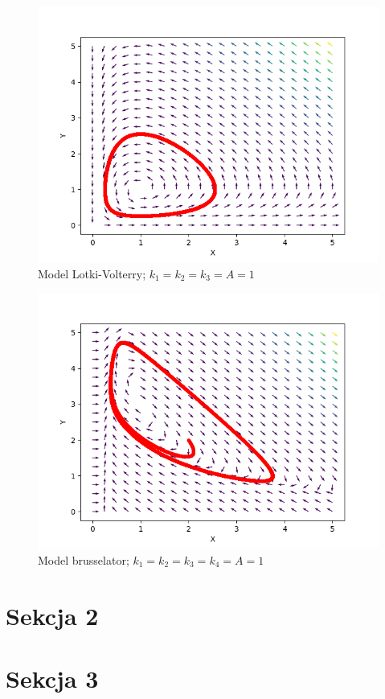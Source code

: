 \documentclass[10pt, a4paper, twoside, onecolumn]{article}
\numberwithin{equation}{section}
\begin{document}
	\begin{figure}[H]\label{img:lotka_volterra}
		\centering
		\includegraphics{lotka_volterra.png}
		\caption{Model Lotki-Volterry; \(k_{1}=k_{2}=k_{3}=A=1\)}
	\end{figure}
	\begin{figure}[H]\label{img:brusselator}
		\centering
		\includegraphics{brusselator.png}
		\caption{Model brusselator; \(k_{1}=k_{2}=k_{3}=k_{4}=A=1\)}
	\end{figure}
	\section{Sekcja 2}
	\section{Sekcja 3}
\end{document}
